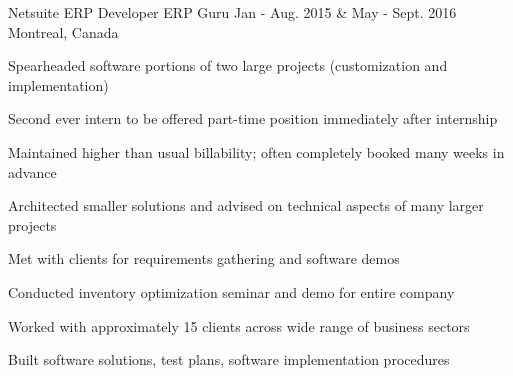 \begin{cventries}
  \cventry
    {Netsuite ERP Developer} %
    {ERP Guru} %
    {Jan - Aug. 2015 \& May - Sept. 2016} %
    {Montreal, Canada} %
    {
      \begin{cvitems} %
        \item{ Spearheaded software portions of two large projects (customization and implementation) }
        \item{ Second ever intern to be offered part-time position immediately after internship }
        \item{ Maintained higher than usual billability; often completely booked many weeks in advance }
        \item{ Architected smaller solutions and advised on technical aspects of many larger projects }
        \item{ Met with clients for requirements gathering and software demos }
        \item{ Conducted inventory optimization seminar and demo for entire company }
        \item{ Worked with approximately 15 clients across wide range of business sectors }
        \item{ Built software solutions, test plans, software implementation procedures }
      \end{cvitems}
    }

\end{cventries}
